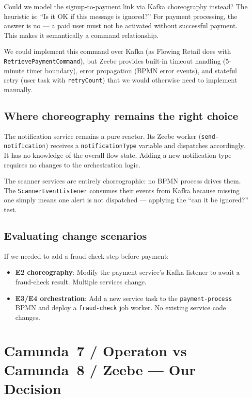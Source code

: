 \documentclass[10pt,a4paper]{article}
\begin{document}
Could we model the signup-to-payment link via Kafka choreography instead? The heuristic is: ``Is it OK if this message is ignored?'' For payment processing, the answer is no --- a paid user must not be activated without successful payment. This makes it semantically a command relationship.

We could implement this command over Kafka (as Flowing Retail does with \texttt{RetrievePaymentCommand}), but Zeebe provides built-in timeout handling (5-minute timer boundary), error propagation (BPMN error events), and stateful retry (user task with \texttt{retryCount}) that we would otherwise need to implement manually.

\subsection{Where choreography remains the right choice}

The notification service remains a pure reactor. Its Zeebe worker (\texttt{send-notification}) receives a \texttt{notificationType} variable and dispatches accordingly. It has no knowledge of the overall flow state. Adding a new notification type requires no changes to the orchestration logic.

The scanner services are entirely choreographic: no BPMN process drives them. The \texttt{ScannerEventListener} consumes their events from Kafka because missing one simply means one alert is not dispatched --- applying the ``can it be ignored?'' test.

\subsection{Evaluating change scenarios}

If we needed to add a fraud-check step before payment:
\begin{itemize}
    \item \textbf{E2 choreography}: Modify the payment service's Kafka listener to await a fraud-check result. Multiple services change.
    \item \textbf{E3/E4 orchestration}: Add a new service task to the \texttt{payment-process} BPMN and deploy a \texttt{fraud-check} job worker. No existing service code changes.
\end{itemize}


\section{Camunda~7 / Operaton vs Camunda~8 / Zeebe --- Our Decision}
\end{document}
